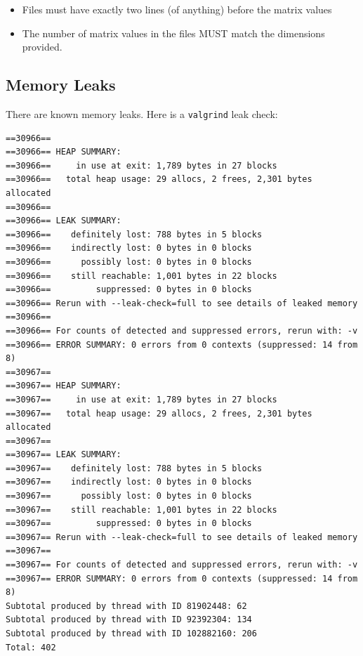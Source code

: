 \documentclass[titlepage]{article}
\begin{document}
\begin{itemize}
	\item Files must have exactly two lines (of anything) before the matrix 
    values
    \item The number of matrix values in the files MUST match the dimensions 
    	  provided.
\end{itemize}

\clearpage

\subsection{Memory Leaks}
There are known memory leaks. Here is a \texttt{valgrind} leak check:

\begin{lstlisting}
==30966== 
==30966== HEAP SUMMARY:
==30966==     in use at exit: 1,789 bytes in 27 blocks
==30966==   total heap usage: 29 allocs, 2 frees, 2,301 bytes allocated
==30966== 
==30966== LEAK SUMMARY:
==30966==    definitely lost: 788 bytes in 5 blocks
==30966==    indirectly lost: 0 bytes in 0 blocks
==30966==      possibly lost: 0 bytes in 0 blocks
==30966==    still reachable: 1,001 bytes in 22 blocks
==30966==         suppressed: 0 bytes in 0 blocks
==30966== Rerun with --leak-check=full to see details of leaked memory
==30966== 
==30966== For counts of detected and suppressed errors, rerun with: -v
==30966== ERROR SUMMARY: 0 errors from 0 contexts (suppressed: 14 from 8)
==30967== 
==30967== HEAP SUMMARY:
==30967==     in use at exit: 1,789 bytes in 27 blocks
==30967==   total heap usage: 29 allocs, 2 frees, 2,301 bytes allocated
==30967== 
==30967== LEAK SUMMARY:
==30967==    definitely lost: 788 bytes in 5 blocks
==30967==    indirectly lost: 0 bytes in 0 blocks
==30967==      possibly lost: 0 bytes in 0 blocks
==30967==    still reachable: 1,001 bytes in 22 blocks
==30967==         suppressed: 0 bytes in 0 blocks
==30967== Rerun with --leak-check=full to see details of leaked memory
==30967== 
==30967== For counts of detected and suppressed errors, rerun with: -v
==30967== ERROR SUMMARY: 0 errors from 0 contexts (suppressed: 14 from 8)
Subtotal produced by thread with ID 81902448: 62
Subtotal produced by thread with ID 92392304: 134
Subtotal produced by thread with ID 102882160: 206
Total: 402
\end{lstlisting}

\clearpage

\end{document}
